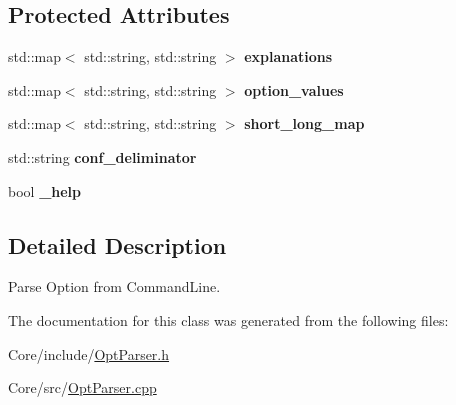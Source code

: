 \subsection*{Protected Attributes}
\begin{DoxyCompactItemize}
\item 
\hypertarget{classskl_1_1_opt_parser_a185db13bf585b6064d5c8829484655c4}{}\label{classskl_1_1_opt_parser_a185db13bf585b6064d5c8829484655c4} 
std\+::map$<$ std\+::string, std\+::string $>$ {\bfseries explanations}
\item 
\hypertarget{classskl_1_1_opt_parser_acfc5e5e788691729aa4c491a531d6f26}{}\label{classskl_1_1_opt_parser_acfc5e5e788691729aa4c491a531d6f26} 
std\+::map$<$ std\+::string, std\+::string $>$ {\bfseries option\+\_\+values}
\item 
\hypertarget{classskl_1_1_opt_parser_a283fca12ae09d559e337a725c54e9623}{}\label{classskl_1_1_opt_parser_a283fca12ae09d559e337a725c54e9623} 
std\+::map$<$ std\+::string, std\+::string $>$ {\bfseries short\+\_\+long\+\_\+map}
\item 
\hypertarget{classskl_1_1_opt_parser_a212dd7ecb4ed3c5175866a3b6df3b365}{}\label{classskl_1_1_opt_parser_a212dd7ecb4ed3c5175866a3b6df3b365} 
std\+::string {\bfseries conf\+\_\+deliminator}
\item 
\hypertarget{classskl_1_1_opt_parser_a2f60d7aa1373b2682e2b524bfd34992e}{}\label{classskl_1_1_opt_parser_a2f60d7aa1373b2682e2b524bfd34992e} 
bool {\bfseries \+\_\+help}
\end{DoxyCompactItemize}


\subsection{Detailed Description}
Parse Option from Command\+Line. 

The documentation for this class was generated from the following files\+:\begin{DoxyCompactItemize}
\item 
Core/include/\hyperlink{_opt_parser_8h}{Opt\+Parser.\+h}\item 
Core/src/\hyperlink{_opt_parser_8cpp}{Opt\+Parser.\+cpp}\end{DoxyCompactItemize}
